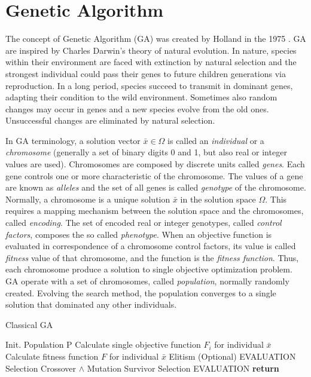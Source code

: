 \section{Genetic Algorithm}\label{genetic_algo_section}
%
The concept of Genetic Algorithm (GA) was created by Holland in the 1975 \cite{bibGA}. GA are inspired by Charles Darwin’s theory of natural evolution. In nature, species within their environment are faced with extinction by natural selection and the strongest individual could pass their genes to future children generations via reproduction. In a long period, species succeed to transmit in dominant genes, adapting their condition to the wild environment. Sometimes also random changes may occur in genes and a new species evolve from the old ones. Unsuccessful changes are eliminated by natural selection. \par
In GA terminology, a solution vector $\bar x \in \Omega$ is called an \textit{individual} or a \textit{chromosome} (generally a set of binary digits 0 and 1, but also real or integer values are used). Chromosomes are composed by discrete units called \textit{genes}. Each gene controls one or more characteristic of the chromosome. The values of a gene are known as \textit{alleles} and the set of all genes is called \textit{genotype} of the chromosome. Normally, a chromosome is a unique solution $\bar x$ in the solution space $\Omega$. This requires a mapping mechanism between the solution space and the chromosomes, called \textit{encoding}. The set of encoded real or integer genotypes, called \textit{control factors}, composes the so called \textit{phenotype}. When an objective function is evaluated in correspondence of a chromosome control factors, its value is called \textit{fitness} value of that chromosome, and the function is the \textit{fitness function}. Thus, each chromosome produce a solution to single objective optimization problem. GA operate with a set of chromosomes, called \textit{population}, normally randomly created. Evolving the search method, the population converges to a single solution that dominated any other individuals. \par
%
\begin{algorithm}
    \caption{Classical GA}\label{alg:ga_algorithm1}
    \begin{algorithmic}[1]
        \State Init. Population P
                \State Calculate single objective function $F_i$ for individual $\bar x$ 
                \State Calculate fitness function $F$ for individual $\bar x$
            \EndWhile
            \State Elitism (Optional)
        \EndProcedure
        \State EVALUATION
            \State Selection
            \State Crossover $\land$ Mutation
            \State Survivor Selection
            \EndProcedure
            \State EVALUATION
        \EndWhile\label{gadwhile}
        \State \textbf{return}
    \end{algorithmic}
\end{algorithm}
